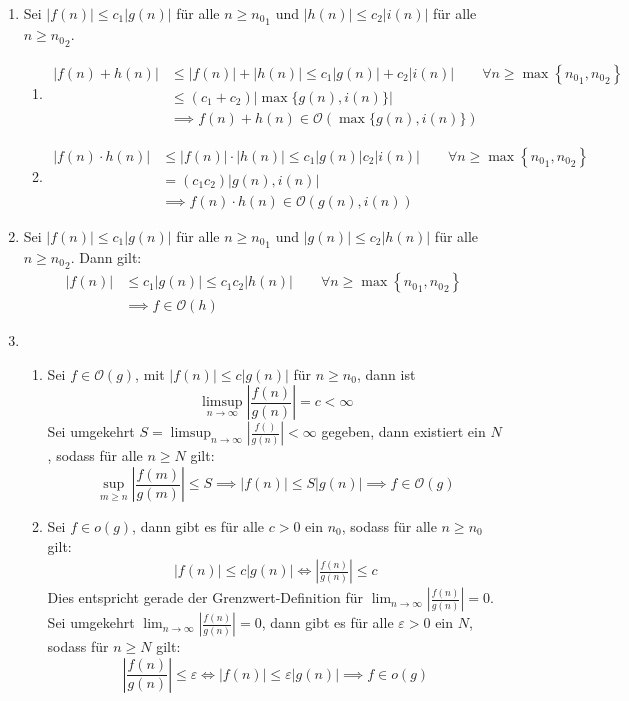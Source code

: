 \documentclass{scrartcl}
\begin{document}
\setcounter{aufgabe}{0}

\begin{enumerate}
\item
Sei $|f(n)|\le c_1|g(n)|$ für alle $n\ge {n_0}_1$ und $|h(n)|\le c_2|i(n)|$ für alle $n\ge {n_0}_2$.
\begin{enumerate}
\item
\begin{align*}
|f(n)+h(n)|
&\le |f(n)|+|h(n)|
\le c_1|g(n)|+c_2|i(n)| \qquad \forall n\ge \max\left\{{n_0}_1, {n_0}_2\right\}\\
&\le (c_1+c_2)|\max\{g(n),i(n)\}| \\
&\implies f(n)+h(n)\in \mathcal O(\max\{g(n),i(n)\})
\end{align*}
\item
\begin{align*}
|f(n)\cdot h(n)|
&\le |f(n)|\cdot|h(n)|
\le c_1|g(n)|c_2|i(n)| \qquad \forall n\ge \max\left\{{n_0}_1, {n_0}_2\right\}\\
&= (c_1c_2)|g(n),i(n)| \\
&\implies f(n)\cdot h(n)\in \mathcal O(g(n),i(n))
\end{align*}
\end{enumerate}

\item
Sei $|f(n)|\le c_1|g(n)|$ für alle $n\ge {n_0}_1$ und $|g(n)|\le c_2|h(n)|$ für alle $n\ge {n_0}_2$.
Dann gilt:
\begin{align*}
|f(n)|
&\le c_1|g(n)|
\le c_1c_2|h(n)| \qquad \forall n\ge \max\left\{{n_0}_1, {n_0}_2\right\}\\
&\implies f\in \mathcal O(h)
\end{align*}

\item
\begin{enumerate}
\item
Sei $f\in\mathcal O(g)$, mit $|f(n)|\le c|g(n)|$ für $n\ge n_0$, dann ist
\[
\limsup_{n\to\infty}\left|\frac{f(n)}{g(n)}\right|=c<\infty
\]
Sei umgekehrt $S=\limsup_{n\to\infty}\left|\frac{f()}{g(n)}\right|<\infty$ gegeben,
dann existiert ein $N$, sodass für alle $n\ge N$ gilt:
\[
\sup_{m\ge n}\left|\frac{f(m)}{g(m)}\right|
\le S
\implies |f(n)|\le S|g(n)|
\implies f\in\mathcal O(g)
\]
\item
Sei $f\in o(g)$, dann gibt es für alle $c>0$ ein $n_0$, sodass für alle $n\ge n_0$ gilt:
\begin{align*}
|f(n)|\le c|g(n)|
\iff \left|\frac{f(n)}{g(n)}\right| \le c
\end{align*}
Dies entspricht gerade der Grenzwert-Definition für $\lim_{n\to\infty}\left|\frac{f(n)}{g(n)}\right|=0$.
Sei umgekehrt $\lim_{n\to\infty}\left|\frac{f(n)}{g(n)}\right|=0$, dann gibt es für alle $\varepsilon>0$ ein $N$,
sodass für $n\ge N$ gilt:
\[
\left|\frac{f(n)}{g(n)}\right| \le \varepsilon
\iff |f(n)|\le \varepsilon|g(n)|
\implies f\in o(g)
\]
\end{enumerate}


\end{enumerate}
\end{document}
